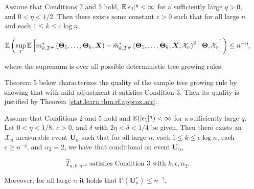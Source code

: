 \begin{theorem}

Assume that Conditions 2 and 5 hold, \(\mathbb{E} | \epsilon_1|^q < \infty\) for a sufficiently large \( q > 0\), and \(0 < \eta < 1/2\). Then there exists some constant \(c > 0\) such that for all large \(n\) and each \(1 \leq k \leq c \log n\),

\[
\mathbb{E} \left( \sup_{T} \mathbb{E} \left[m_{k, T^{\#}}^* \left( \boldsymbol{\Theta}_1, \ldots, \boldsymbol{\Theta}_k , \boldsymbol{X}\right) - \hat{m}_{k, T^{\#}}^* \left( \boldsymbol{\Theta}_1, \ldots, \boldsymbol{\Theta}_k , \boldsymbol{X}, \mathcal{X}_n \right)^2 \mid \boldsymbol{\Theta}, \mathcal{X}_n  \right]  \right) \leq n^{-\eta},
\]

where the supremum is over all possible deterministic tree growing rules.

\end{theorem}

Theorem 5 below characterizes the quality of the sample tree growing rule by showing that with mild adjustment it satisfies Condition 3. Then its quality is justified by Theorem \ref{stat.learn.thm.rf.approx.acc}. 

\begin{theorem}

Assume that Conditions 2 and 5 hold and \(\mathbb{E}(|\epsilon_1|^q) < \infty\) for a sufficiently large \(q\). Let \(0 < \eta < 1/8\), \(c > 0\), and \(\delta\) with \(2 \eta < \delta < 1/4\) be given. Then there exists an \(\mathcal{X}_n\)-measurable event \(\boldsymbol{U}_n\) such that for all large \(n\), each \(1 \leq k \leq c \log n\), each \(\epsilon \geq n^{-\eta}\), and \(\alpha_2 = 2\), we have that conditional on event \(\boldsymbol{U}_n\),

\[
\hat{T}_{n, k, n^{-\delta}} \text{ satisfies Condition 3 with } k, \epsilon, \alpha_2.
\]

Moreover, for all large \(n\) it holds that \(\mathbb{P}(\boldsymbol{U}_n^c) \leq  n^{-1}\).

\end{theorem}

%
%
%
%
%
%
%
%
%

%
%
%
